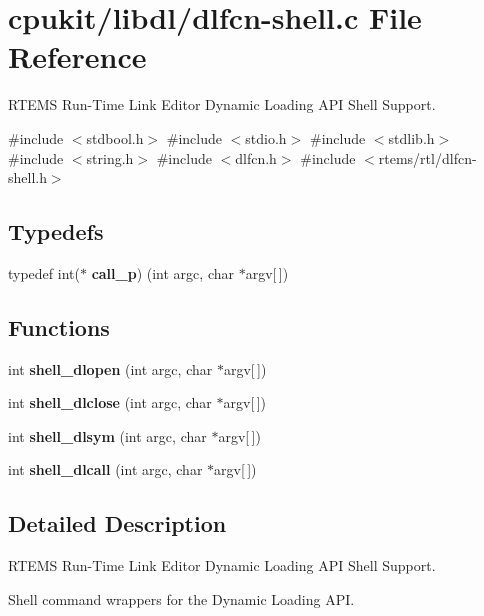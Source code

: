 \hypertarget{dlfcn-shell_8c}{}\section{cpukit/libdl/dlfcn-\/shell.c File Reference}
\label{dlfcn-shell_8c}


R\+T\+E\+MS Run-\/\+Time Link Editor Dynamic Loading A\+PI Shell Support.  


{\ttfamily \#include $<$stdbool.\+h$>$}\newline
{\ttfamily \#include $<$stdio.\+h$>$}\newline
{\ttfamily \#include $<$stdlib.\+h$>$}\newline
{\ttfamily \#include $<$string.\+h$>$}\newline
{\ttfamily \#include $<$dlfcn.\+h$>$}\newline
{\ttfamily \#include $<$rtems/rtl/dlfcn-\/shell.\+h$>$}\newline
\subsection*{Typedefs}
\begin{DoxyCompactItemize}
\item 
\mbox{\label{dlfcn-shell_8c_ae676eb23d1545d5e5a00273e16c79176}} 
typedef int($\ast$ {\bfseries call\+\_\+p}) (int argc, char $\ast$argv\mbox{[}$\,$\mbox{]})
\end{DoxyCompactItemize}
\subsection*{Functions}
\begin{DoxyCompactItemize}
\item 
\mbox{\label{dlfcn-shell_8c_aae4e541ac0273d4efde4d52aa9a8f03e}} 
int {\bfseries shell\+\_\+dlopen} (int argc, char $\ast$argv\mbox{[}$\,$\mbox{]})
\item 
\mbox{\label{dlfcn-shell_8c_aad381545dcc91f74ee04a0bbe2cbb838}} 
int {\bfseries shell\+\_\+dlclose} (int argc, char $\ast$argv\mbox{[}$\,$\mbox{]})
\item 
\mbox{\label{dlfcn-shell_8c_a56ea41aacc78856a050eba1cf26ed656}} 
int {\bfseries shell\+\_\+dlsym} (int argc, char $\ast$argv\mbox{[}$\,$\mbox{]})
\item 
\mbox{\label{dlfcn-shell_8c_ab656bab254c5c49e7ece4938aacf321b}} 
int {\bfseries shell\+\_\+dlcall} (int argc, char $\ast$argv\mbox{[}$\,$\mbox{]})
\end{DoxyCompactItemize}


\subsection{Detailed Description}
R\+T\+E\+MS Run-\/\+Time Link Editor Dynamic Loading A\+PI Shell Support. 

Shell command wrappers for the Dynamic Loading A\+PI. 